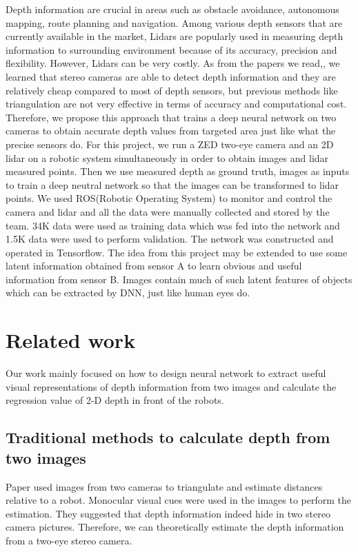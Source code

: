 \documentclass[10pt,twocolumn,letterpaper]{article}
\begin{document}
Depth information are crucial in areas such as obstacle avoidance, autonomous mapping, route planning and navigation. Among various depth sensors that are currently available in the market, Lidars are popularly used in measuring depth information to surrounding environment because of its accuracy, precision and flexibility. However, Lidars can be very costly. As from the papers we read\cite{kyto2011method},\cite{jones2011head}, \cite{diebel2004simultaneous} we learned that stereo cameras are able to detect depth information and they are relatively cheap compared to most of depth sensors, but previous methods like triangulation are not very effective in terms of accuracy and computational cost. Therefore, we propose this approach that trains a deep neural network on two cameras to obtain accurate depth values from targeted area just like what the precise sensors do. For this project, we run a ZED two-eye camera and an 2D lidar on a robotic system simultaneously in order to obtain images and lidar measured points. Then we use measured depth as ground truth, images as inputs to train a deep neutral network so that the images can be transformed to lidar points. We used ROS(Robotic Operating System) to monitor and control the camera and lidar and all the data were manually collected and stored by the team. 34K data were used as training data which was fed into the network and 1.5K data were used to perform validation. The network was constructed and operated in Tensorflow. The idea from this project may be extended to use some latent information obtained from sensor A to learn obvious and useful information from sensor B. Images contain much of such latent features of objects which can be extracted by DNN, just like human eyes do.
\section{Related work}
Our work mainly focused on how to design neural network to extract useful visual representations of depth information from two images and calculate the regression value of  2-D depth in front of the robots.
\subsection{Traditional methods to calculate depth from two images}
Paper \cite{saxena2007depth} used images from two cameras to triangulate and estimate distances relative to a robot. Monocular visual cues were used in the images to perform the estimation. They suggested that depth information indeed hide in two stereo camera pictures. Therefore, we can theoretically estimate the depth information from a two-eye stereo camera.  
\end{document}

